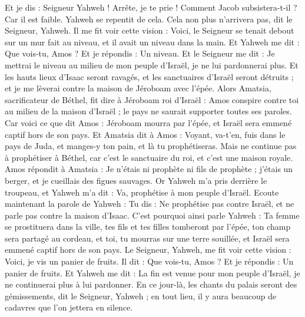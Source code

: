 \begin{multicols}{2}
Et je dis : Seigneur Yahweh ! Arrête, je te prie ! Comment Jacob subsistera-t-il ? Car il est faible.
Yahweh se repentit de cela. Cela non plus n'arrivera pas, dit le Seigneur, Yahweh.
Il me fit voir cette vision : Voici, le Seigneur se tenait debout sur un mur fait au niveau, et il avait un niveau dans la main.
Et Yahweh me dit : Que vois-tu, Amos ? Et je répondis : Un niveau. Et le Seigneur me dit : Je mettrai le niveau au milieu de mon peuple d'Israël, je ne lui pardonnerai plus.
Et les hauts lieux d'Isaac seront ravagés, et les sanctuaires d'Israël seront détruits ; et je me lèverai contre la maison de Jéroboam avec l'épée.
Alors Amatsia, sacrificateur de Béthel, fit dire à Jéroboam roi d'Israël : Amos conspire contre toi au milieu de la maison d'Israël ; le pays ne saurait supporter toutes ses paroles.
Car voici ce que dit Amos : Jéroboam mourra par l'épée, et Israël sera emmené captif hors de son pays.
Et Amatsia dit à Amos : Voyant, va-t’en, fuis dans le pays de Juda, et manges-y ton pain, et là tu prophétiseras.
Mais ne continue pas à prophétiser à Béthel, car c'est le sanctuaire du roi, et c'est une maison royale.
Amos répondit à Amatsia : Je n'étais ni prophète ni fils de prophète ; j'étais un berger, et je cueillais des figues sauvages.
Or Yahweh m’a pris derrière le troupeau, et Yahweh m’a dit : Va, prophétise à mon peuple d'Israël.
Ecoute maintenant la parole de Yahweh : Tu dis : Ne prophétise pas contre Israël, et ne parle pas contre la maison d'Isaac.
C'est pourquoi ainsi parle Yahweh : Ta femme se prostituera dans la ville, tes fils et tes filles tomberont par l'épée, ton champ sera partagé au cordeau, et toi, tu mourras sur une terre souillée, et Israël sera emmené captif hors de son pays.
\VerseOne{}Le Seigneur, Yahweh, me fit voir cette vision : Voici, je vis un panier de fruits.
Il dit : Que vois-tu, Amos ? Et je répondis : Un panier de fruits. Et Yahweh me dit : La fin est venue pour mon peuple d'Israël, je ne continuerai plus à lui pardonner.
En ce jour-là, les chants du palais seront des gémissements, dit le Seigneur, Yahweh ; en tout lieu, il y aura beaucoup de cadavres que l'on jettera en silence.

\end{multicols}
